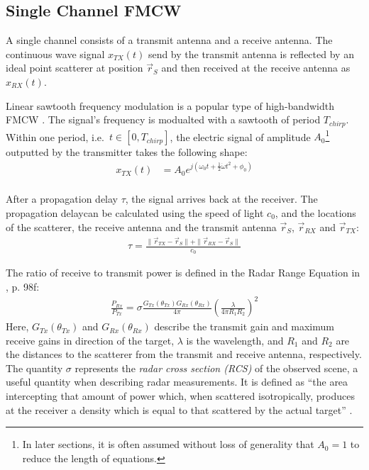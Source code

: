 \subsection{Single Channel FMCW}
\label{sec:single_channel_fmcw}
A single channel consists of a transmit antenna and a receive antenna.
The continuous wave signal $x_{TX}(t)$ send by the transmit antenna
is reflected by an ideal point scatterer at position $\vec r_S$
and then received at the receive antenna as $x_{RX}(t)$.

Linear sawtooth frequency modulation is a popular type of high-bandwidth FMCW \cite{jankiraman}.
The signal's frequency is modualted with a sawtooth of period $T_{chirp}$.
Within one period, i.e.\ $t \in [0, T_{chirp}]$,
the electric signal of amplitude $A_0$\footnote{
    In later sections, it is often assumed without loss of generality that $A_0=1$ to reduce the length of equations.
} outputted by the transmitter takes the following shape:
\begin{align}
    x_{TX}(t) & = A_0 e^{j(\omega_0t + \frac{1}{2}\dot \omega t^2 + \phi_0)} \label{eq:x_TX} \\
\end{align}

After a propagation delay $\tau$, the signal arrives back at the receiver.
The propagation delaycan be calculated using the speed of light $c_0$,
and the locations of the scatterer, the receive antenna and the transmit antenna $\vec r_S$,  $\vec r_{RX}$ and $\vec r_{TX}$:
\begin{align}
    \tau = \frac{\| \vec r_{TX} - \vec r_S \|+\| \vec r_{RX} - \vec r_S \|}{c_0}
\end{align}

The ratio of receive to transmit power is defined in the Radar Range Equation in \cite{balanis},  p. 98f:
\begin{align}
    \frac{P_{Rx}}{P_{Tx}} = \sigma \frac{G_{Tx}(\theta_{Tx}) G_{Rx}(\theta_{Rx})}{4\pi} \left(\frac{\lambda}{4\pi R_1 R_2}\right)^2
    \label{eq:channel_gain}
\end{align}
Here, $G_{Tx}(\theta_{Tx})$ and $G_{Rx}(\theta_{Rx})$ describe the transmit gain and maximum receive gains
in direction of the target, $\lambda$ is the wavelength, and $R_1$ and $R_2$ are the distances to the scatterer
from the transmit and receive antenna, respectively.
The quantity $\sigma$ represents the \emph{radar cross section (RCS)} of the observed scene,
a useful quantity when describing radar measurements.
It is defined as ``the area intercepting that amount of power which,
when scattered isotropically, produces at the receiver a density
which is equal to that scattered by the actual target'' \cite{balanis_engineering_1989}.

